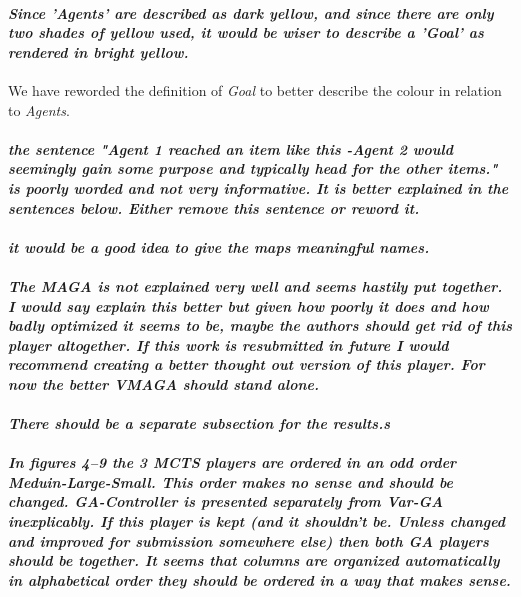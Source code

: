 \documentclass{article}
\begin{document}
\paragraph*{\textit{Since 'Agents' are described as dark yellow, and since there are only two shades of yellow used, it would be wiser to describe a 'Goal' as rendered in bright yellow.}}
We have reworded the definition of \emph{Goal} to better describe the colour in relation to \emph{Agents}.
\paragraph*{\textit{the sentence "Agent 1 reached an item like this -Agent 2 would seemingly gain some purpose and typically head for the other items." is poorly worded and not very informative. It is better explained in the sentences below. Either remove this sentence or reword it.}}

\paragraph*{\textit{it would be a good idea to give the maps meaningful names.}}
\paragraph*{\textit{The MAGA is not explained very well and seems hastily put together. I would say explain this better but given how poorly it does and how badly optimized it seems to be, maybe the authors should get rid of this player altogether. If this work is resubmitted in future I would recommend creating a better thought out version of this player. For now the better VMAGA should stand alone.
}}
\paragraph*{\textit{There should be a separate subsection for the results.s}}
\paragraph*{\textit{In figures 4--9 the 3 MCTS players are ordered in an odd order Meduin-Large-Small. This order makes no sense and should be changed. GA-Controller is presented separately from Var-GA inexplicably. If this player is kept (and it shouldn't be. Unless changed and improved for submission somewhere else) then both GA players should be together. It seems that columns are organized automatically in alphabetical order they should be ordered in a way that makes sense.}}
\end{document}
